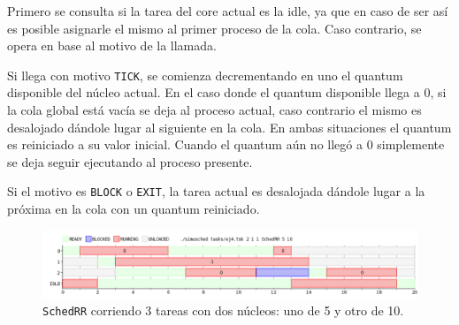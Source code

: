 Primero se consulta si la tarea del core actual es la idle, ya que
en caso de ser así es posible asignarle el mismo al primer proceso de la cola. Caso
contrario, se opera en base al motivo de la llamada.

Si llega con motivo \texttt{TICK}, se comienza decrementando en uno el quantum disponible
del núcleo actual. En el caso donde el quantum disponible llega a 0, si la cola
global está vacía se deja al proceso actual, caso contrario el mismo es
desalojado dándole lugar al siguiente en la cola. En ambas situaciones el
quantum es reiniciado a su valor inicial. Cuando el quantum aún no llegó a 0
simplemente se deja seguir ejecutando al proceso presente.

Si el motivo es \texttt{BLOCK} o \texttt{EXIT}, la tarea actual es desalojada
dándole lugar a la próxima en la cola con un quantum reiniciado.

\begin{figure}[ht]
	\begin{center}
		\includegraphics[width=1\columnwidth]{imagenes/ej4.png}
		\caption{\texttt{SchedRR} corriendo 3 tareas con dos núcleos: uno de 5 y
		otro de 10.}
	\end{center}
\end{figure}
